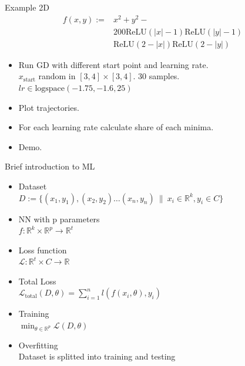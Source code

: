 \documentclass{beamer}
\begin{document}
\begin{frame}{Example 2D}
	\begin{align*}
		f(x, y) := 
			&x^2 + y^2 - \\
			&200 \mathrm{ReLU}(|x|-1) \mathrm{ReLU}(|y|-1) \\
			&\mathrm{ReLU}(2-|x|) \mathrm{ReLU}(2-|y|)
	\end{align*}
	
	\begin{itemize}
		\item Run GD with different start point and learning rate.\\
		$x_{\text{start}}$ random in $\left[3, 4\right] \times \left[3, 4\right]$. 30 samples. \\
		$lr \in \text{logspace}(-1.75, -1.6, 25)$
		\item Plot trajectories.
		\item For each learning rate calculate share of each minima.
		\item Demo.
	\end{itemize}
	 	
\end{frame}
    
\begin{frame}{Brief introduction to ML}
	\begin{itemize}
		\item Dataset\\
		 $D := \{(x_1, y_1), (x_2, y_2) \ldots (x_n, y_n) \:\|\: x_i \in \mathbb{R}^k, y_i \in C \}$
		 \item NN with p parameters\\
		 $f: \mathbb{R}^k \times \mathbb{R}^p \rightarrow \mathbb{R}^t$\\
		 \item Loss function\\
		 $\mathcal{L}: \mathbb{R}^t \times C \rightarrow \mathbb{R} $
		 \item Total Loss\\
		 $\mathcal{L}_{\text{total}}(D, \theta) = \sum_{i=1}^{n} l(f(x_i, \theta), y_i)$
		 \item Training\\
		 $\min_{\theta \in \mathbb{R}^p} \mathcal{L}(D, \theta)$
		 \item Overfitting\\
		 Dataset is splitted into training and testing
	\end{itemize}

\end{frame}
\end{document}
